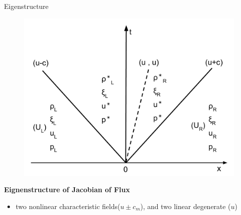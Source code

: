 \documentclass{beamer}
\begin{document}
\begin{frame}{Eigenstructure}
\noindent
\begin{minipage}{.54\textwidth}
\begin{figure}
\centering
\includegraphics[width=.85\textwidth]{./Chapter-2/Figures/Solution_Structure_RP}
\label{fig:Domain_3D}
\end{figure}
\large{\textbf{Eignenstructure of Jacobian of Flux}}
\begin{itemize}
\item two nonlinear characteristic fields($u \pm c_m$), and two linear degenerate ($u$)
\end{itemize} 


\end{minipage}
\end{frame}
\end{document}
